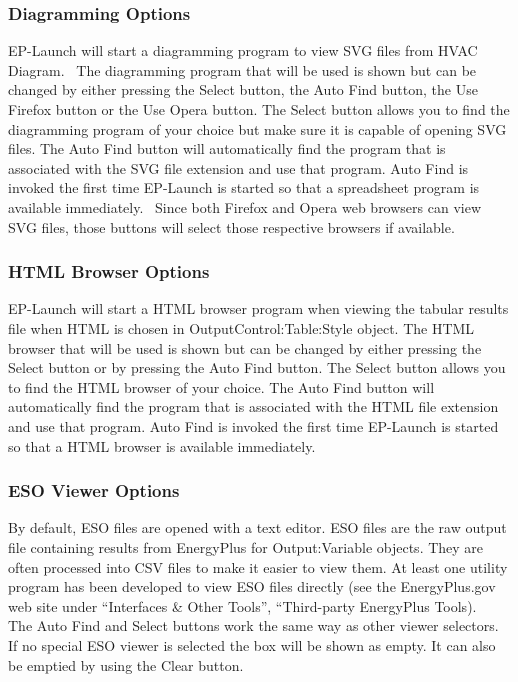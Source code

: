 \subsubsection{Diagramming Options}\label{diagramming-options}

EP-Launch will start a diagramming program to view SVG files from HVAC Diagram.~ The diagramming program that will be used is shown but can be changed by either pressing the Select button, the Auto Find button, the Use Firefox button or the Use Opera button. The Select button allows you to find the diagramming program of your choice but make sure it is capable of opening SVG files. The Auto Find button will automatically find the program that is associated with the SVG file extension and use that program. Auto Find is invoked the first time EP-Launch is started so that a spreadsheet program is available immediately.~ Since both Firefox and Opera web browsers can view SVG files, those buttons will select those respective browsers if available.

\subsubsection{HTML Browser Options}\label{html-browser-options}

EP-Launch will start a HTML browser program when viewing the tabular results file when HTML is chosen in OutputControl:Table:Style object. The HTML browser that will be used is shown but can be changed by either pressing the Select button or by pressing the Auto Find button. The Select button allows you to find the HTML browser of your choice. The Auto Find button will automatically find the program that is associated with the HTML file extension and use that program. Auto Find is invoked the first time EP-Launch is started so that a HTML browser is available immediately.

\subsubsection{ESO Viewer Options}\label{eso-viewer-options}

By default, ESO files are opened with a text editor. ESO files are the raw output file containing results from EnergyPlus for Output:Variable objects. They are often processed into CSV files to make it easier to view them. At least one utility program has been developed to view ESO files directly (see the EnergyPlus.gov web site under ``Interfaces \& Other Tools'', ``Third-party EnergyPlus Tools).~ The Auto Find and Select buttons work the same way as other viewer selectors. If no special ESO viewer is selected the box will be shown as empty. It can also be emptied by using the Clear button.

